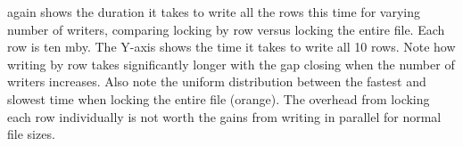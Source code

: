  again shows the duration it takes to write all the rows this time for varying number of writers, comparing locking by row versus locking the entire file. Each row is ten \ac{mby}. The Y-axis shows the time it takes to write all 10 rows. Note how writing by row takes significantly longer with the gap closing when the number of writers increases. Also note the uniform distribution between the fastest and slowest time when locking the entire file (orange). The overhead from locking each row individually is not worth the gains from writing in parallel for normal file sizes.
%

\clearpage

